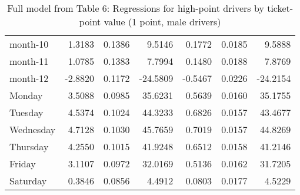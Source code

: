 \documentclass[10pt]{article}
\begin{document}
\begin{table}[ht]
\begin{tabular}{lrrrrrr}
  month-10 & 1.3183 & 0.1386 & 9.5146 & 0.1772 & 0.0185 & 9.5888 \\ 
  month-11 & 1.0785 & 0.1383 & 7.7994 & 0.1480 & 0.0188 & 7.8769 \\ 
  month-12 & -2.8820 & 0.1172 & -24.5809 & -0.5467 & 0.0226 & -24.2154 \\ 
  Monday & 3.5088 & 0.0985 & 35.6231 & 0.5639 & 0.0160 & 35.1755 \\ 
  Tuesday & 4.5374 & 0.1024 & 44.3233 & 0.6826 & 0.0157 & 43.4677 \\ 
  Wednesday & 4.7128 & 0.1030 & 45.7659 & 0.7019 & 0.0157 & 44.8269 \\ 
  Thursday & 4.2550 & 0.1015 & 41.9248 & 0.6512 & 0.0158 & 41.2146 \\ 
  Friday & 3.1107 & 0.0972 & 32.0169 & 0.5136 & 0.0162 & 31.7205 \\ 
  Saturday & 0.3846 & 0.0856 & 4.4912 & 0.0803 & 0.0177 & 4.5229 \\ 
   \hline
\end{tabular}
\caption{Full model from Table 6: Regressions for high-point drivers by ticket-point value (1 point, male drivers)} 
\label{tab_6_1_pts_no_age_M}
\end{table}


\clearpage
\pagebreak



\end{document}
